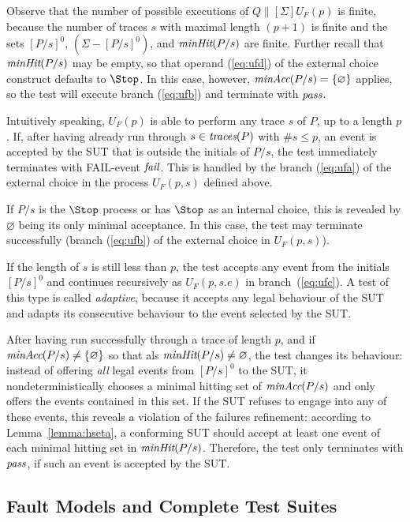 Observe that the number of possible executions of $Q\parallel[\Sigma] U_F(p)$ is finite,
because the number of traces $s$ with maximal length $(p+1)$ is finite and the 
sets $[P/s]^0$, $(\Sigma - [P/s]^0)$, and $\text{\it minHit}(P/s)$ are finite. Further recall
that $\text{\it minHit}(P/s)$ may be empty, so that operand (\ref{eq:ufd})
of the external choice construct  defaults to $\Stop$. In this case, however, 
$\text{\it minAcc}(P/s) = \{\varnothing\}$ applies, 
so the test will execute branch (\ref{eq:ufb}) and
terminate with ${\text{\it pass}}$.

Intuitively speaking, $U_F(p)$ is able to perform any trace $s$ of $P$, up to
a length $p$. If, after having already run through $s\in\text{\it traces}(P)$ with 
$\#s \le p$, an event is accepted by the SUT that is outside the initials of $P/s$,
the test immediately terminates with FAIL-event ${\text{\it fail}}$. This is handled by
the branch (\ref{eq:ufa}) of the external choice in the process $U_F(p,s)$
defined above.

If $P/s$ is the $\Stop$ process or has $\Stop$ as an internal choice, 
this is revealed by $\varnothing$ being  its only minimal acceptance. 
In this case, the test may terminate successfully (branch (\ref{eq:ufb}) of
the external choice in $U_F(p,s)$). 


If the length of $s$ is still less than $p$, the test accepts any event from
the initials $[P/s]^0$ and continues recursively as $U_F(p,s.e)$ in
branch~(\ref{eq:ufc}). A test of this type is called \emph{adaptive}, because
it accepts any legal behaviour of the SUT and adapts its consecutive
behaviour to the event selected by the SUT.

After having  run successfully
through a trace of length $p$, and if $\text{\it minAcc}(P/s)\neq\{\varnothing\}$ so that
als $\text{\it minHit}(P/s)\neq\varnothing$,
the test changes its behaviour:
instead of offering {\it all} legal events from $[P/s]^0$ to the SUT,
it nondeterministically chooses
a minimal hitting set of $\text{\it minAcc}(P/s)$ and only offers the events contained in this set.
If the SUT refuses to engage into any of these events, this reveals a violation of the
failures refinement: according to Lemma~\ref{lemma:hseta}, a conforming SUT should accept
at least one event of each minimal hitting set in $\text{\it minHit}(P/s)$. Therefore, the test
only terminates with  ${\text{\it pass}}$, if such an event is accepted by the SUT.



\subsection{Fault Models and Complete Test Suites}

